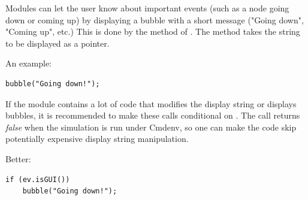 Modules can let the user know about important events (such as a node
going down or coming up) by displaying a bubble with a short message
("Going down", "Coming up", etc.) This is done by the  method
of . The method takes the string to be displayed
as a  pointer.

An example:
\begin{verbatim}
bubble("Going down!");
\end{verbatim}

If the module contains a lot of code that modifies the display string or
displays bubbles, it is recommended to make these calls conditional
on . The  call returns \textit{false}
when the simulation is run under Cmdenv, so one can make the code skip
potentially expensive display string manipulation.

Better:
\begin{verbatim}
if (ev.isGUI())
    bubble("Going down!");
\end{verbatim}

